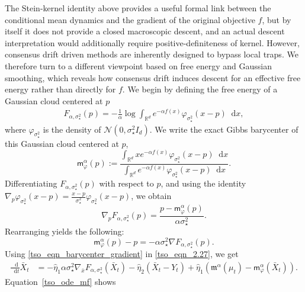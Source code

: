\documentclass{article}
\def\m{\mathfrak{m}}
\newcommand*\der{\mathop{}\!\mathrm{d}}
\numberwithin{equation}{section}
\begin{document}
The Stein-kernel identity above provides a useful formal link between the conditional mean dynamics and the gradient of the original objective $f$, but by itself it does not provide a closed macroscopic descent, and an actual descent interpretation would additionally require positive-definiteness of kernel. However, consensus drift driven methods are inherently designed to bypass local traps.  We therefore turn to a different viewpoint based on free energy and Gaussian smoothing, which reveals how consensus drift induces descent for an effective free energy rather than directly for $f$. We begin by defining the free energy of a Gaussian cloud centered at $p$
\begin{align}\label{tso_eqn_eff_free_ene}
    F_{\alpha,\sigma_\star^2}(p) = -\frac{1}{\alpha} \log \int_{\mathbb{R}^d} e^{-\alpha f(x)} \varphi_{\sigma_\star^2}(x-p)\der x,
\end{align}
where $\varphi_{\sigma_\star^2}$ is the density of $\mathcal{N}(0, \sigma_\star^2 I_d)$.  We write the exact Gibbs barycenter of this Gaussian cloud centered at $p$,
\begin{equation}
    \mathsf{m}^\alpha_\varphi(p) :=  \frac{\int_{\mathbb{R}^d} x e^{-\alpha f(x)} \varphi_{\sigma_\star^2}(x-p)\der x}{\int_{\mathbb{R}^d} e^{-\alpha f(x)} \varphi_{\sigma_\star^2}(x-p
    )\der x}.
\end{equation}
Differentiating $F_{\alpha,\sigma_\star^2}(p)$ with respect to $p$, and using the  identity $\nabla_p \varphi_{\sigma_\star^2}(x-p) = \frac{x-p}{\sigma_\star^2} \varphi_{\sigma_\star^2}(x-p)$, we obtain
\begin{equation}
    \nabla_p F_{\alpha,\sigma_\star^2}(p) = \frac{p - \mathsf{m}^\alpha_\varphi(p)}{\alpha\sigma_\star^2}.
\end{equation}
Rearranging yields the following:
\begin{equation}
    \mathsf{m}^\alpha_\varphi(p) - p = -\alpha\sigma_\star^2 \nabla F_{\alpha,\sigma_\star^2}(p).
    \label{tso_eqn_barycenter_gradient}
\end{equation}
Using \eqref{tso_eqn_barycenter_gradient} in \eqref{tso_eqn_2.27}, we get
\begin{align}\label{tso_ode_mf}
     \frac{\der}{\der t} \bar{X}_t &= -\hat{\eta}_1\alpha\sigma_\star^2 \nabla_{\bar{x}} F_{\alpha,\sigma_\star^2}(\bar{X}_t) - \hat{\eta}_2 (\bar{X}_t - Y_t) + \hat{\eta}_1(\m^\alpha(\mu_t) - \mathsf{m}^{\alpha}_\varphi(\bar{X}_t)).
\end{align}
Equation~\eqref{tso_ode_mf} shows
\end{document}
